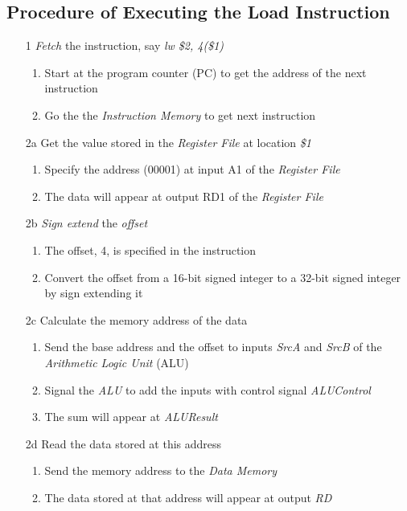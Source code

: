 \documentclass[12pt]{article}
\theoremstyle{definition}
\begin{document}
  \subsection{Procedure of Executing the Load Instruction}
  \begin{enumerate}
    \item[1] \emph{Fetch} the instruction, say \emph{lw \$2, 4(\$1)}
    \begin{enumerate}
      \item Start at the program counter (PC) to get the address of the next instruction
      \item Go the the \emph{Instruction Memory} to get next instruction
    \end{enumerate}
    \item[2a] Get the value stored in the \emph{Register File} at location \emph{\$1}
    \begin{enumerate}
      \item Specify the address (00001) at input A1 of the \emph{Register File}
      \item The data will appear at output RD1 of the \emph{Register File}
    \end{enumerate}
    \item[2b] \emph{Sign extend} the \emph{offset}
    \begin{enumerate}
      \item The offset, 4, is specified in the instruction
      \item Convert the offset from a 16-bit signed integer to a 32-bit signed integer by sign extending it
    \end{enumerate}
    \item[2c] Calculate the memory address of the data
    \begin{enumerate}
      \item Send the base address and the offset to inputs \emph{SrcA} and \emph{SrcB} of the \emph{Arithmetic Logic Unit} (ALU)
      \item Signal the \emph{ALU} to add the inputs with control signal \emph{ALUControl}
      \item The sum will appear at \emph{ALUResult}
    \end{enumerate}
    \item[2d] Read the data stored at this address
    \begin{enumerate}
      \item Send the memory address to the \emph{Data Memory}
      \item The data stored at that address will appear at output \emph{RD}

\end{enumerate}
\end{enumerate}
\end{document}
